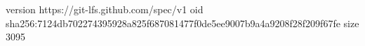 version https://git-lfs.github.com/spec/v1
oid sha256:7124db702274395928a825f687081477f0de5ee9007b9a4a9208f28f209f67fe
size 3095
